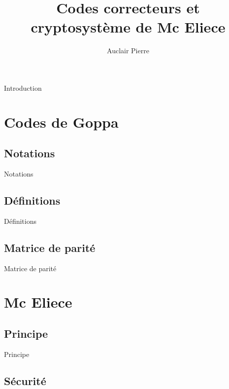 \documentclass{beamer}
\title{Codes correcteurs et cryptosystème de Mc Eliece}
\author{Auclair Pierre}
\begin{document}
	\begin{frame}{Introduction}
		\tableofcontents
		
	\end{frame}

	\section{Codes de Goppa}

		\subsection{Notations}

			\begin{frame}{Notations}



			\end{frame}

		\subsection{Définitions}

			\begin{frame}{Définitions}
				
			\end{frame}

		\subsection{Matrice de parité}

			\begin{frame}{Matrice de parité}
						
			\end{frame}		

	\section{Mc Eliece}

		\subsection{Principe}

			\begin{frame}{Principe}
				
			\end{frame}

		\subsection{Sécurité}
\end{document}
